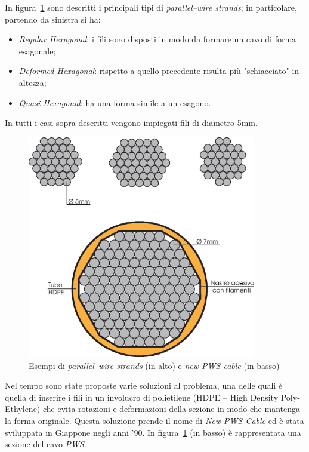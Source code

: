 In figura~\ref{fig:parallel_wire_strands} sono descritti i principali tipi di \emph{parallel--wire strands}; in particolare, partendo da sinistra si ha:
\begin{itemize}
	\item \emph{Regular Hexagonal}: i fili sono disposti in modo da formare un cavo di forma esagonale;
	\item \emph{Deformed Hexagonal}: rispetto a quello precedente risulta più "schiacciato" in altezza;
	\item \emph{Quasi Hexagonal}: ha una forma simile a un esagono.
\end{itemize}

In tutti i casi sopra descritti vengono impiegati fili di diametro \num{5}\si{mm}.

\begin{figure}
	\centering
	\includegraphics[width=10cm]{Immagini/Parallel_wire_strands}
	\caption{Esempi di \emph{parallel--wire strands} (in alto) e \emph{new PWS cable} (in basso)}
	\label{fig:parallel_wire_strands}
\end{figure}

Nel tempo sono state proposte varie soluzioni al problema, una delle quali è quella di inserire i fili in un involucro di polietilene (HDPE -- High Density Poly-Ethylene) che evita rotazioni e deformazioni della sezione in modo che mantenga la forma originale. Questa soluzione prende il nome di \emph{New PWS Cable} ed è stata sviluppata in Giappone negli anni '90. In figura~\ref{fig:parallel_wire_strands} (in basso) è rappresentata una sezione del cavo \textit{PWS}.




